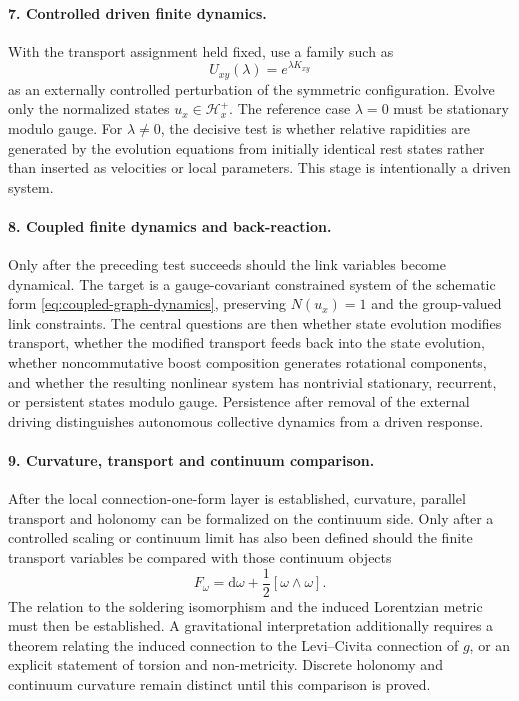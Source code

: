 \documentclass[11pt,a4paper]{article}
\theoremstyle{remark}
\newcommand{\dd}{\mathrm d}
\begin{document}
\paragraph{7. Controlled driven finite dynamics.}
With the transport assignment held fixed, use a family such as
\begin{equation}
  U_{xy}(\lambda)=e^{\lambda K_{xy}}
\tag{7.7}
\end{equation}
as an externally controlled perturbation of the symmetric configuration.  Evolve only the normalized states \(u_x\in\mathcal H_x^+\).  The reference case \(\lambda=0\) must be stationary modulo gauge.  For \(\lambda\ne0\), the decisive test is whether relative rapidities are generated by the evolution equations from initially identical rest states rather than inserted as velocities or local parameters.  This stage is intentionally a driven system.

\paragraph{8. Coupled finite dynamics and back-reaction.}
Only after the preceding test succeeds should the link variables become dynamical.  The target is a gauge-covariant constrained system of the schematic form \eqref{eq:coupled-graph-dynamics}, preserving \(N(u_x)=1\) and the group-valued link constraints.  The central questions are then whether state evolution modifies transport, whether the modified transport feeds back into the state evolution, whether noncommutative boost composition generates rotational components, and whether the resulting nonlinear system has nontrivial stationary, recurrent, or persistent states modulo gauge.  Persistence after removal of the external driving distinguishes autonomous collective dynamics from a driven response.

\paragraph{9. Curvature, transport and continuum comparison.}
After the local connection-one-form layer is established, curvature, parallel transport and holonomy can be formalized on the continuum side.  Only after a controlled scaling or continuum limit has also been defined should the finite transport variables be compared with those continuum objects
\begin{equation}
  F_\omega=\dd\omega+\frac12[\omega\wedge\omega].
\tag{7.8}
\end{equation}
The relation to the soldering isomorphism and the induced Lorentzian metric must then be established.  A gravitational interpretation additionally requires a theorem relating the induced connection to the Levi--Civita connection of \(g\), or an explicit statement of torsion and non-metricity.  Discrete holonomy and continuum curvature remain distinct until this comparison is proved.
\end{document}

